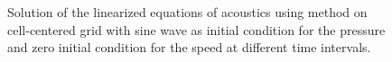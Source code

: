 \begin{figure}[]
   
   
     \caption{Solution of the linearized equations of acoustics using \protect{\lw} method on cell-centered grid with sine wave as initial condition for the pressure and zero initial condition for the speed at different time intervals.}
   \label{fig:sol_sin}
\end{figure} 

